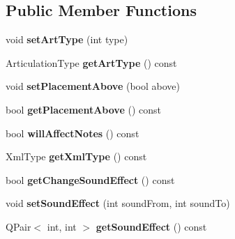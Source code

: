 \subsection*{Public Member Functions}
\begin{DoxyCompactItemize}
\item 
\mbox{\label{class_o_v_e_1_1_articulation_a40829f597d47c8cbff5d2d473a1e1ac5}} 
void {\bfseries set\+Art\+Type} (int type)
\item 
\mbox{\label{class_o_v_e_1_1_articulation_aae1acdf733ebf1269c0d0dda53d30870}} 
Articulation\+Type {\bfseries get\+Art\+Type} () const
\item 
\mbox{\label{class_o_v_e_1_1_articulation_a4186680441786778e87980977b689845}} 
void {\bfseries set\+Placement\+Above} (bool above)
\item 
\mbox{\label{class_o_v_e_1_1_articulation_a072bac6f674410e749e0ed8899f28246}} 
bool {\bfseries get\+Placement\+Above} () const
\item 
\mbox{\label{class_o_v_e_1_1_articulation_a96d0addad7746eb0468d2883a3eda615}} 
bool {\bfseries will\+Affect\+Notes} () const
\item 
\mbox{\label{class_o_v_e_1_1_articulation_a6bcb8e03fa1d053850b65081959d82b3}} 
Xml\+Type {\bfseries get\+Xml\+Type} () const
\item 
\mbox{\label{class_o_v_e_1_1_articulation_abfcb62f714173d5b1709cf33b450bef5}} 
bool {\bfseries get\+Change\+Sound\+Effect} () const
\item 
\mbox{\label{class_o_v_e_1_1_articulation_a6bf1facbd5703ad34511057af019ba8e}} 
void {\bfseries set\+Sound\+Effect} (int sound\+From, int sound\+To)
\item 
\mbox{\label{class_o_v_e_1_1_articulation_a3cccf45e4d98e25060504f9673d271da}} 
Q\+Pair$<$ int, int $>$ {\bfseries get\+Sound\+Effect} () const
\item 

\end{DoxyCompactItemize}
